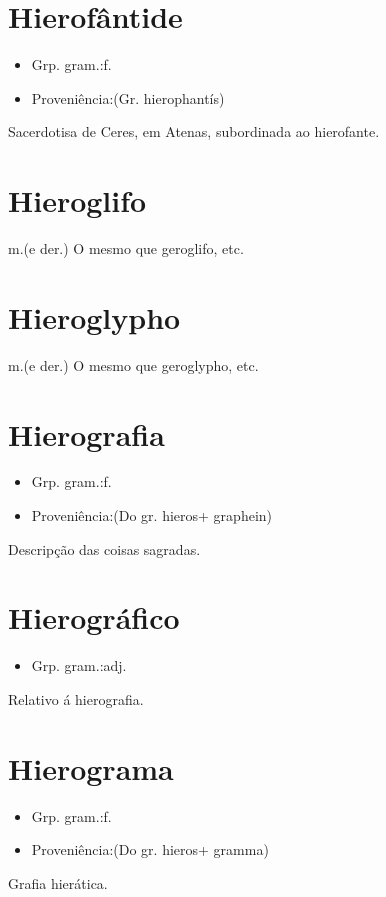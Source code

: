 \documentclass{article}
\begin{document}
\section{Hierofântide}
\begin{itemize}
\item {Grp. gram.:f.}
\end{itemize}
\begin{itemize}
\item {Proveniência:(Gr. \textunderscore hierophantís\textunderscore )}
\end{itemize}
Sacerdotisa de Ceres, em Atenas, subordinada ao hierofante.
\section{Hieroglifo}
\textunderscore m.\textunderscore  (e der.)
O mesmo que \textunderscore geroglifo\textunderscore , etc.
\section{Hieroglypho}
\textunderscore m.\textunderscore  (e der.)
O mesmo que \textunderscore geroglypho\textunderscore , etc.
\section{Hierografia}
\begin{itemize}
\item {Grp. gram.:f.}
\end{itemize}
\begin{itemize}
\item {Proveniência:(Do gr. \textunderscore hieros\textunderscore  + \textunderscore graphein\textunderscore )}
\end{itemize}
Descripção das coisas sagradas.
\section{Hierográfico}
\begin{itemize}
\item {Grp. gram.:adj.}
\end{itemize}
Relativo á hierografia.
\section{Hierograma}
\begin{itemize}
\item {Grp. gram.:f.}
\end{itemize}
\begin{itemize}
\item {Proveniência:(Do gr. \textunderscore hieros\textunderscore  + \textunderscore gramma\textunderscore )}
\end{itemize}
Grafia hierática.
\end{document}
